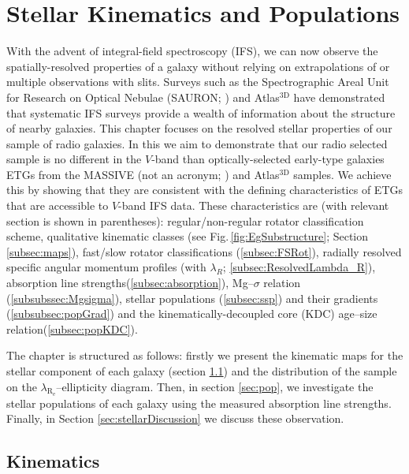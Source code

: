 \chapter{Stellar Kinematics and Populations}
	\label{cha:stellar}
With the advent of integral-field spectroscopy (IFS), we can now observe the spatially-resolved properties of a galaxy without relying on extrapolations of or multiple observations with slits. Surveys such as the Spectrographic Areal Unit for Research on Optical Nebulae (SAURON; \citealt{deZeeuw2002}) and Atlas$^\text{3D}$ \citep{Cappellari2011} have demonstrated that systematic IFS surveys provide a wealth of information about the structure of nearby galaxies. This chapter focuses on the resolved stellar properties of our sample of radio galaxies. In this we aim to demonstrate that our radio selected sample is no different in the $V$-band than optically-selected early-type galaxies ETGs from the MASSIVE (not an acronym; \citealt{Ma2014}) and Atlas$^\text{3D}$ samples. We achieve this by showing that they are consistent with the defining characteristics of ETGs that are accessible to $V$-band IFS data. These characteristics are (with relevant section is shown in parentheses): regular/non-regular rotator classification scheme, qualitative kinematic classes (see Fig.\,\ref{fig:EgSubstructure}; Section \ref{subsec:maps}), fast/slow rotator classifications (\ref{subsec:FSRot}), radially resolved specific angular momentum profiles (with $\lambda_R$; \ref{subsec:ResolvedLambda_R}), absorption line strengths(\ref{subsec:absorption}), Mg--$\sigma$ relation (\ref{subsubssec:Mgsigma}), stellar populations (\ref{subsec:ssp}) and their gradients (\ref{subsubsec:popGrad}) and the kinematically-decoupled core (KDC) age--size relation(\ref{subsec:popKDC}). 

The chapter is structured as follows: firstly we present the kinematic maps for the stellar component of each galaxy (section \ref{sec:stellarKin}) and the distribution of the sample on the $\lambda_\mathrm{R_e}$--ellipticity diagram. Then, in section \ref{sec:pop}, we investigate the stellar populations of each galaxy using the measured absorption line strengths. Finally, in Section \ref{sec:stellarDiscussion} we discuss these observation.


\section{Kinematics}
	\label{sec:stellarKin}

